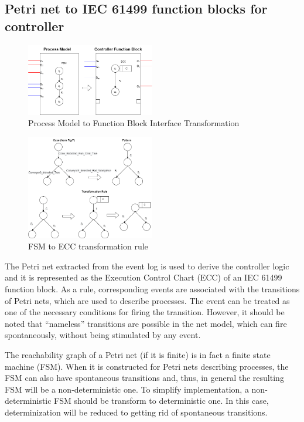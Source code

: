 \documentclass[conference]{IEEEtran}
\begin{document}
\subsection{Petri net to IEC 61499 function blocks for controller}
\label{subsec:PNtoIEC61499}

\begin{figure}[!t]
	\centering
	\includegraphics[width=0.5\textwidth]{images/ControlTransformation.png} 
	\caption{Process  Model  to Function Block Interface Transformation }
	\label{ControllerTransformation}
\end{figure}

\begin{figure}[!t]
	\centering
	\includegraphics[width=0.5\textwidth]{images/UpdatedControllerConversionrules.png}
	\caption{ FSM to ECC transformation rule}
	\label{conversionrules}
\end{figure}

The Petri net extracted from the event log is used to derive the controller logic and it is  represented as the Execution Control Chart (ECC) of an IEC 61499 function block. 
As a rule, corresponding events are associated with the transitions of Petri nets, which are used to describe processes. The event can be treated as one of the necessary conditions for firing the transition. However, it should be noted that “nameless” transitions are possible in the net model, which can fire spontaneously, without being stimulated by any event.

The reachability graph of a Petri net (if it is finite) is in fact a finite state machine (FSM). When it is constructed for Petri nets describing processes, the FSM can also have spontaneous transitions and, thus, in general the resulting FSM will be a non-deterministic one. To simplify implementation, a non-deterministic FSM should be transform to deterministic one. In this case, determinization will be reduced to getting rid of spontaneous transitions.
\end{document}
